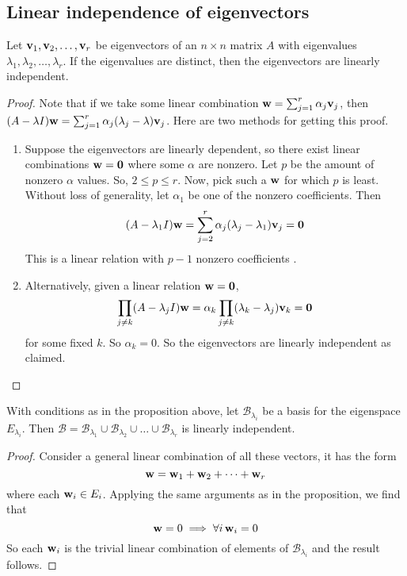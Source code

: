 \subsection{Linear independence of eigenvectors}
\begin{proposition}
	Let \(\vb v_1, \vb v_2, \dots, \vb v_r\) be eigenvectors of an \(n\times n\) matrix \(A\) with eigenvalues \(\lambda_1, \lambda_2,\dots,\lambda_r\).
	If the eigenvalues are distinct, then the eigenvectors are linearly independent.
\end{proposition}
\begin{proof}
	Note that if we take some linear combination \(\vb w = \sum_{j=1}^r \alpha_j\vb v_j\), then \((A - \lambda I)\vb w = \sum_{j=1}^r \alpha_j(\lambda_j - \lambda)\vb v_j\).
	Here are two methods for getting this proof.
	\begin{enumerate}
		\item Suppose the eigenvectors are linearly dependent, so there exist linear combinations \(\vb w = \vb 0\) where some \(\alpha\) are nonzero.
		      Let \(p\) be the amount of nonzero \(\alpha\) values.
		      So, \(2 \leq p \leq r\).
		      Now, pick such a \(\vb w\) for which \(p\) is least.
		      Without loss of generality, let \(\alpha_1\) be one of the nonzero coefficients.
		      Then
		      \[
			      (A - \lambda_1 I)\vb w = \sum_{j=2}^r \alpha_j(\lambda_j - \lambda_1)\vb v_j = \vb 0
		      \]
		      This is a linear relation with \(p-1\) nonzero coefficients \contradiction.
		\item Alternatively, given a linear relation \(\vb w=\vb 0\),
		      \[
			      \prod_{j \neq k} (A - \lambda_j I) \vb w = \alpha_k \prod_{j \neq k} (\lambda_k - \lambda_j) \vb v_k = \vb 0
		      \]
		      for some fixed \(k\).
		      So \(\alpha_k = 0\).
		      So the eigenvectors are linearly independent as claimed.
	\end{enumerate}
\end{proof}
\begin{corollary}
	With conditions as in the proposition above, let \(\mathcal B_{\lambda_i}\) be a basis for the eigenspace \(E_{\lambda_i}\).
	Then \(\mathcal B = \mathcal B_{\lambda_1} \cup \mathcal B_{\lambda_2} \cup \dots \cup \mathcal B_{\lambda_r}\) is linearly independent.
\end{corollary}
\begin{proof}
	Consider a general linear combination of all these vectors, it has the form
	\[
		\vb w = \vb w_1 + \vb w_2 + \dots + \vb w_r
	\]
	where each \(\vb w_i \in E_i\).
	Applying the same arguments as in the proposition, we find that
	\[
		\vb w = 0 \implies \forall i\,\vb w_i = 0
	\]
	So each \(\vb w_i\) is the trivial linear combination of elements of \(\mathcal B_{\lambda_i}\) and the result follows.
\end{proof}
